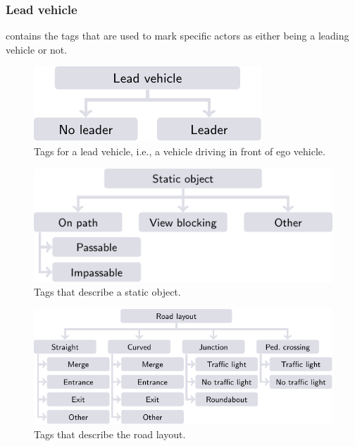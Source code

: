 \subsubsection{Lead vehicle}
\label{sec:lead vehicle}

 contains the tags that are used to mark specific actors as either being a leading vehicle or not.

\begin{figure}
	\centering
	\includegraphics{figures/lead_vehicle}
	\caption{Tags for a lead vehicle, i.e., a vehicle driving in front of ego vehicle.}
	\label{fig:tree lead vehicle}
\end{figure}

\begin{figure}
	\centering
	\includegraphics{figures/static_object}
	\caption{Tags that describe a static object.}
	\label{fig:tree static object}
\end{figure}



\begin{figure}[t!]
	\centering
	\includegraphics{figures/road_layout}
	\caption{Tags that describe the road layout.}
	\label{fig:tree road layout}
\end{figure}

